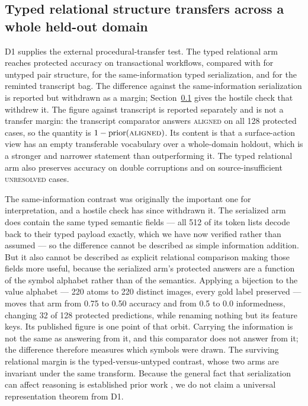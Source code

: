 \subsection{Typed relational structure transfers across a whole held-out domain}
\label{sec:d1-hostile}

D1 supplies the external procedural-transfer test. The typed relational arm reaches \DOneTypedAccuracy{} protected accuracy on transactional workflows, compared with \DOneUntypedAccuracy{} for untyped pair structure, \DOneSerializedAccuracy{} for the same-information typed serialization, and \DOneTranscriptAccuracy{} for the reminted transcript bag. The \DOneTypedMinusSerialized{} difference against the same-information serialization is reported but withdrawn as a margin; Section~\ref{sec:d1-hostile} gives the hostile check that withdrew it. The \DOneTypedMinusTranscript{} figure against transcript is reported separately and is not a transfer margin: the transcript comparator answers \textsc{aligned} on all 128 protected cases, so the quantity is $1-\text{prior}(\textsc{aligned})$. Its content is that a surface-action view has an empty transferable vocabulary over a whole-domain holdout, which is a stronger and narrower statement than outperforming it. The typed relational arm also preserves \DOneTypedDoubleAccuracy{} accuracy on double corruptions and \DOneTypedUnresolvedAccuracy{} on source-insufficient \textsc{unresolved} cases.

The same-information contrast was originally the important one for interpretation, and a hostile check has since withdrawn it. The serialized arm does contain the same typed semantic fields --- all 512 of its token lists decode back to their typed payload exactly, which we have now verified rather than assumed --- so the \DOneTypedMinusSerialized{} difference cannot be described as simple information addition. But it also cannot be described as explicit relational comparison making those fields more useful, because the serialized arm's protected answers are a function of the symbol alphabet rather than of the semantics. Applying a bijection to the value alphabet --- 220 atoms to 220 distinct images, every gold label preserved --- moves that arm from 0.75 to 0.50 accuracy and from 0.5 to 0.0 informedness, changing 32 of 128 protected predictions, while renaming nothing but its feature keys. Its published figure is one point of that orbit. Carrying the information is not the same as answering from it, and this comparator does not answer from it; the difference therefore measures which symbols were drawn. The surviving relational margin is the typed-versus-untyped contrast, whose two arms are invariant under the same transform. Because the general fact that serialization can affect reasoning is established prior work \citep{lo2026serialization}, we do not claim a universal representation theorem from D1.

